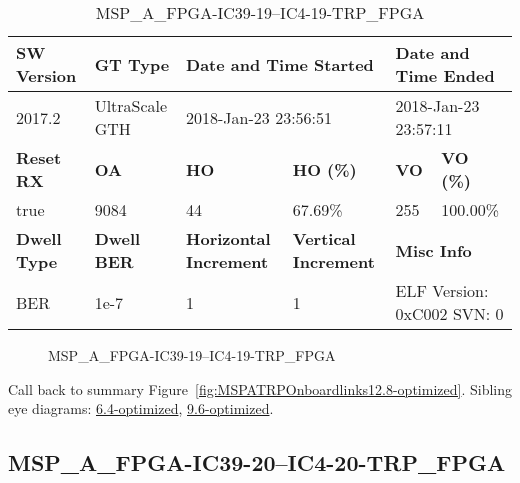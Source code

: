 \begin{table}[h]
\centering
\caption{MSP\_A\_FPGA-IC39-19--IC4-19-TRP\_FPGA}
\label{tab:MSPAFPGAIC3919IC419TRPFPGA12.8-optimized}
\begin{tabular}{@{}|l|l|l|l|l|l|@{}}
\toprule
\textbf{SW Version}                & \textbf{GT Type}   & \multicolumn{2}{l|}{\textbf{Date and Time Started}}            & \multicolumn{2}{l|}{\textbf{Date and Time Ended}}        \\ \midrule
2017.2                       & UltraScale GTH          & \multicolumn{2}{l|}{2018-Jan-23 23:56:51}                   & \multicolumn{2}{l|}{2018-Jan-23 23:57:11}               \\ \midrule
\textbf{Reset RX}                  & \textbf{OA} & \textbf{HO}   & \textbf{HO (\%)} & \textbf{VO} & \textbf{VO (\%)} \\ \midrule
true & 9084        & 44          & 67.69\%        & 255        & 100.00\%       \\ \midrule
\textbf{Dwell Type}                & \textbf{Dwell BER} & \textbf{Horizontal Increment} & \textbf{Vertical Increment}    & \multicolumn{2}{l|}{\textbf{Misc Info}}                  \\ \midrule
BER                            & 1e-7        & 1        & 1           & \multicolumn{2}{l|}{ELF Version: 0xC002 SVN: 0}                         \\ \bottomrule
\end{tabular}
\end{table}

\begin{figure}[h]
\caption{MSP\_A\_FPGA-IC39-19--IC4-19-TRP\_FPGA} \label{fig:MSPAFPGAIC3919IC419TRPFPGA12.8-optimized}
\end{figure}

Call back to summary Figure~\ref{fig:MSPATRPOnboardlinks12.8-optimized}.
Sibling eye diagrams: \hyperref[sec:MSPAFPGAIC3919IC419TRPFPGA6.4-optimized]{6.4-optimized}, \hyperref[sec:MSPAFPGAIC3919IC419TRPFPGA9.6-optimized]{9.6-optimized}.

\clearpage
\newpage


\subsection{MSP\_A\_FPGA-IC39-20--IC4-20-TRP\_FPGA}\label{sec:MSPAFPGAIC3920IC420TRPFPGA12.8-optimized}

